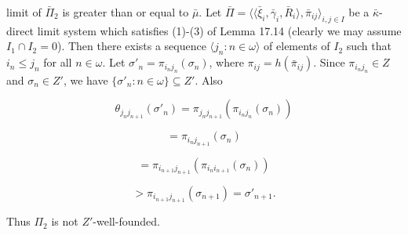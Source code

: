 limit of $\bar{\Pi}_2$ is greater than or equal to $\bar{\mu}$. Let $\bar{\Pi} = \langle \langle \bar{\xi}_i, \bar{\gamma}_i, \bar{R}_i \rangle, \bar{\pi}_{ij} \rangle_{i,j \in I}$ be a $\bar{\kappa}$-direct limit system which satisfies (1)-(3) of Lemma 17.14 (clearly we may assume $I_1 \cap I_2 = 0$). Then there exists a sequence $\langle j_n: n \in \omega \rangle$ of elements of $I_2$ such that $i_n \leq j_n$ for all $n \in \omega$. Let $\sigma'_n = \pi_{i_n j_n}(\sigma_n)$, where $\pi_{ij} = h(\bar{\pi}_{ij})$. Since $\pi_{i_n j_n} \in Z$ and $\sigma_n \in Z'$, we have $\{\sigma'_n: n \in \omega\} \subseteq Z'$. Also

$$\theta_{j_n j_{n+1}}(\sigma'_n) = \pi_{j_n j_{n+1}}(\pi_{i_n j_n}(\sigma_n))$$

$$= \pi_{i_n j_{n+1}}(\sigma_n)$$

$$= \pi_{i_{n+1} j_{n+1}}(\pi_{i_n i_{n+1}}(\sigma_n))$$

$$> \pi_{i_{n+1} j_{n+1}}(\sigma_{n+1}) = \sigma'_{n+1}.$$

Thus $\Pi_2$ is not $Z'$-well-founded.
